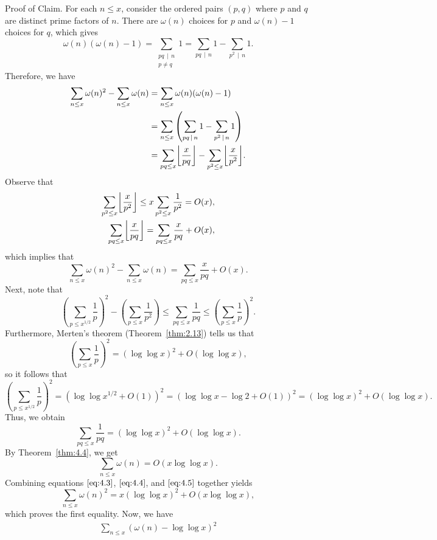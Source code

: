 \begin{pf}
    {\sc Proof of Claim.} For each $n \leq x$, consider the ordered pairs 
    $(p, q)$ where $p$ and $q$ are distinct prime factors of $n$. There are 
    $\omega(n)$ choices for $p$ and $\omega(n) - 1$ choices for $q$, which gives 
    \[ \omega(n)(\omega(n) - 1) = \sum_{\substack{pq\,\mid\,n \\ p \neq q}} 1 
    = \sum_{pq\,\mid\,n} 1 - \sum_{p^2\,\mid\,n} 1. \] 
    Therefore, we have 
    \begin{align*} 
        \sum_{n\leq x} \omega(n)^2 - \sum_{n\leq x} \omega(n) 
        &= \sum_{n\leq x} \omega(n)(\omega(n) - 1) \\ 
        &= \sum_{n\leq x} \left( \sum_{pq\,\mid\,n} 1 - \sum_{p^2\,\mid\,n} 1 \right) \\
        &= \sum_{pq \leq x} \floor*{\frac{x}{pq}} - \sum_{p^2 \leq x} \floor*{\frac{x}{p^2}}.
    \end{align*}
    Observe that 
    \begin{align*} 
        \sum_{p^2 \leq x} \floor*{\frac{x}{p^2}} 
        \leq x \sum_{p^2 \leq x} \frac{1}{p^2} = O(x), \\ 
        \sum_{pq \leq x} \floor*{\frac{x}{pq}} 
        = \sum_{pq \leq x} \frac{x}{pq} + O(x), 
    \end{align*}
    which implies that 
    \[ \sum_{n\leq x} \omega(n)^2 - \sum_{n\leq x} \omega(n) 
    = \sum_{pq\leq x} \frac{x}{pq} + O(x). \tag{4.3}\label{eq:4.3} \] 
    Next, note that 
    \[ \left( \sum_{p\leq x^{1/2}} \frac1p \right)^{\!2} 
    - \left( \sum_{p\leq x} \frac1{p^2} \right) 
    \leq \sum_{pq\leq x} \frac{1}{pq} 
    \leq \left( \sum_{p\leq x} \frac1p \right)^{\!2}. \] 
    Furthermore, Merten's theorem (Theorem~\ref{thm:2.13}) tells us that 
    \[ \left( \sum_{p\leq x} \frac1p \right)^{\!2} = (\log\log x)^2 
    + O(\log\log x), \] 
    so it follows that 
    \[ \left( \sum_{p\leq x^{1/2}} \frac1p \right)^{\!2} 
    = \left(\log\log x^{1/2} + O(1)\right)^2 
    = (\log\log x - \log 2 + O(1))^2 
    = (\log\log x)^2 + O(\log\log x). \] 
    Thus, we obtain 
    \[ \sum_{pq\leq x} \frac{1}{pq} = (\log\log x)^2 + O(\log\log x). 
    \tag{4.4}\label{eq:4.4} \] 
    By Theorem~\ref{thm:4.4}, we get 
    \[ \sum_{n\leq x} \omega(n) = O(x\log\log x). \tag{4.5}\label{eq:4.5} \] 
    Combining equations $\eqref{eq:4.3}$, $\eqref{eq:4.4}$, and $\eqref{eq:4.5}$ 
    together yields 
    \[ \sum_{n\leq x} \omega(n)^2 = x(\log\log x)^2 + O(x\log\log x), \] 
    which proves the first equality. Now, we have 
    \begin{align*}
        \sum_{n\leq x} (\omega(n) - \log\log x)^2 

\end{align*}
\end{pf}
